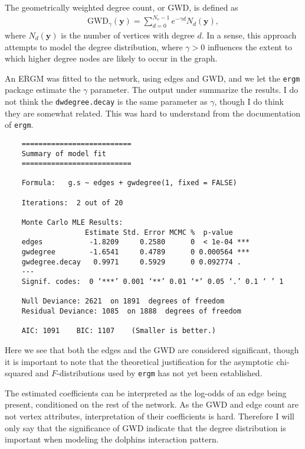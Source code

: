 \documentclass[11pt,a4paper]{article}
\begin{document}
The geometrically weighted degree count, or GWD, is defined as
\begin{align}
    \text{GWD}_\gamma (\mathbf y) = \sum_{d = 0}^{N_v - 1} e^{-\gamma d}N_d(\mathbf y),
\end{align}
where $N_d(\mathbf y)$ is the number of vertices with degree $d$. In a sense, this approach attempts to model the degree distribution, where $\gamma > 0$ influences the extent to which higher degree nodes are likely to occur in the graph.

An ERGM was fitted to the network, using edges and GWD, and  we let the \verb+ergm+ package estimate the $\gamma$ parameter. 
The output under summarize the results.
I do not think the \verb+dwdegree.decay+ is the same parameter as $\gamma$, though I do think they are somewhat related.  
This was hard to understand from the documentation of \verb+ergm+. 
\begin{verbatim}
    ==========================
    Summary of model fit
    ==========================
    
    Formula:   g.s ~ edges + gwdegree(1, fixed = FALSE)
    
    Iterations:  2 out of 20 
    
    Monte Carlo MLE Results:
                   Estimate Std. Error MCMC %  p-value    
    edges           -1.8209     0.2580      0  < 1e-04 ***
    gwdegree        -1.6541     0.4789      0 0.000564 ***
    gwdegree.decay   0.9971     0.5929      0 0.092774 .  
    ---
    Signif. codes:  0 ‘***’ 0.001 ‘**’ 0.01 ‘*’ 0.05 ‘.’ 0.1 ‘ ’ 1
    
    Null Deviance: 2621  on 1891  degrees of freedom
    Residual Deviance: 1085  on 1888  degrees of freedom
      
    AIC: 1091    BIC: 1107    (Smaller is better.) 
\end{verbatim}
Here we see that both the edges and the GWD are considered significant, though it is important to note that the theoretical justification for the asymptotic chi-squared and $F$-distributions used by \verb+ergm+ has not yet been established.

The estimated coefficients can be interpreted as the log-odds of an edge being present, conditioned on the rest of the network. As the GWD and edge count are not vertex attributes, interpretation of their coefficients is hard. Therefore I will only say that the significance of GWD indicate that the degree distribution is important when modeling the dolphins interaction pattern.
\end{document}
